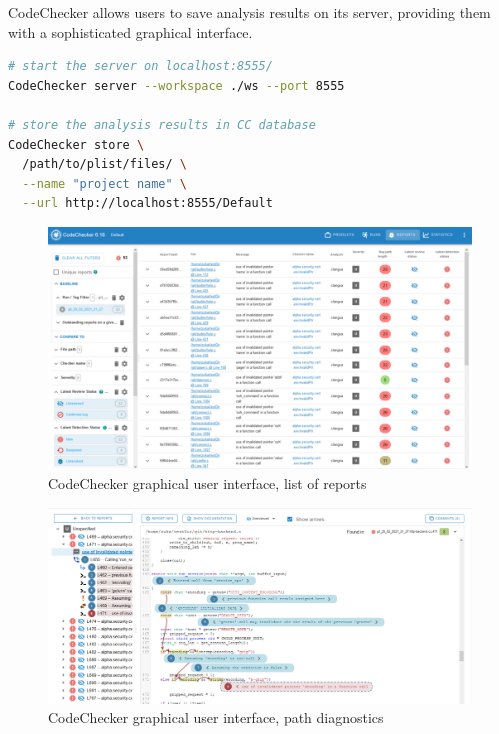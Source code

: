 CodeChecker allows users to save analysis results on its server, providing them with a sophisticated graphical interface. 

\begin{lstlisting}[language={bash}]
# start the server on localhost:8555/
CodeChecker server --workspace ./ws --port 8555

# store the analysis results in CC database
CodeChecker store \
  /path/to/plist/files/ \
  --name "project name" \
  --url http://localhost:8555/Default
\end{lstlisting}



\begin{figure}[H]
	\centering
	\includegraphics[width=\textwidth]{images/codechecker_reports_new_new.png}
	\caption{CodeChecker graphical user interface, list of reports}
	\label{fig:cc-reports}
\end{figure}

\begin{figure}[H]
	\centering
	\includegraphics[width=\textwidth]{images/cc_path.PNG}
	\caption{CodeChecker graphical user interface, path diagnostics}
	\label{fig:cc-arrows}
\end{figure}
